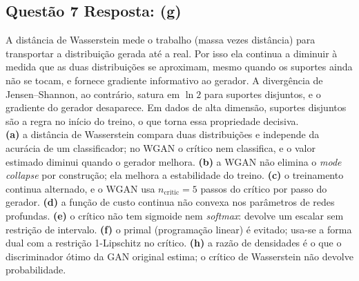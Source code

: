 \documentclass[11pt,a4paper]{article}
\begin{document}
\subsection*{Questão 7 \textemdash{} Resposta: (g)}
A distância de Wasserstein mede o trabalho (massa vezes distância) para transportar a distribuição gerada até a real. Por isso ela continua a diminuir à medida que as duas distribuições se aproximam, mesmo quando os suportes ainda não se tocam, e fornece gradiente informativo ao gerador. A divergência de Jensen--Shannon, ao contrário, satura em $\ln 2$ para suportes disjuntos, e o gradiente do gerador desaparece. Em dados de alta dimensão, suportes disjuntos são a regra no início do treino, o que torna essa propriedade decisiva.\\
\textbf{(a)} a distância de Wasserstein compara duas distribuições e independe da acurácia de um classificador; no WGAN o crítico nem classifica, e o valor estimado diminui quando o gerador melhora.
\textbf{(b)} a WGAN não elimina o \textit{mode collapse} por construção; ela melhora a estabilidade do treino.
\textbf{(c)} o treinamento continua alternado, e o WGAN usa $n_{\text{critic}} = 5$ passos do crítico por passo do gerador.
\textbf{(d)} a função de custo continua não convexa nos parâmetros de redes profundas.
\textbf{(e)} o crítico não tem sigmoide nem \textit{softmax}: devolve um escalar sem restrição de intervalo.
\textbf{(f)} o primal (programação linear) é evitado; usa-se a forma dual com a restrição 1-Lipschitz no crítico.
\textbf{(h)} a razão de densidades é o que o discriminador ótimo da GAN original estima; o crítico de Wasserstein não devolve probabilidade.
\end{document}
